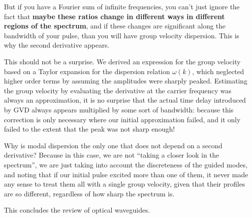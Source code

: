 But if you have a Fourier sum of infinite frequencies, you can't just ignore the fact that \textbf{maybe these ratios change in different ways in different regions of the spectrum}, and if these changes are significant along the bandwidth of your pulse, than you will have group velocity dispersion. This is why the second derivative appears.

This should not be a surprise. We derived an expression for the group velocity based on a Taylor expansion for the dispersion relation $\omega(k)$, which neglected higher order terms by assuming the amplitudes were sharply peaked. Estimating the group velocity by evaluating the derivative at the carrier frequency was always an approximation, it is no surprise that the actual time delay introduced by GVD always appears multiplied by some sort of bandwidth: because this correction is only necessary where our initial approximation failed, and it only failed to the extent that the peak was not sharp enough!

Why is modal dispersion the only one that does not depend on a second derivative? Because in this case, we are not ``taking a closer look in the spectrum'', we are just taking into account the discreteness of the guided modes, and noting that if our initial pulse excited more than one of them, it never made any sense to treat them all with a single group velocity, given that their profiles are so different, regardless of how sharp the spectrum is.

\hrulefill

This concludes the review of optical waveguides.

\hrulefill


